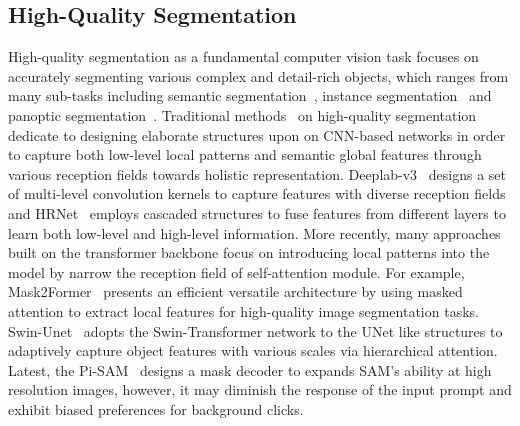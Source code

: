 \subsection{High-Quality Segmentation}
High-quality segmentation as a fundamental computer vision task focuses on accurately segmenting various complex and detail-rich objects, which ranges from many sub-tasks including semantic segmentation~\cite{long2015fully,zhao2017pyramid}, instance segmentation~\cite{he2017mask,dai2016instance} and panoptic segmentation~\cite{kirillov2019panoptic}. 
Traditional methods~\cite{Panoptic-deeplab,deeplab-v3,hrnet,medseg1,cascadepsp} on high-quality segmentation dedicate to designing elaborate structures upon on CNN-based networks in order to capture both low-level local patterns and semantic global features through various reception fields towards holistic representation.
Deeplab-v3~\cite{deeplab-v3} designs a set of multi-level convolution kernels to capture features with diverse reception fields and HRNet~\cite{hrnet} employs cascaded structures to fuse features from different layers to learn both low-level and high-level information.
More recently, many approaches~\cite{swin-unet,SegFormer,SegGPT,maskformer,mask2former} built on the transformer backbone focus on introducing local patterns into the model by narrow the reception field of self-attention module. For example, Mask2Former~\cite{mask2former} presents an efficient versatile architecture by using masked attention to extract local features for high-quality image segmentation tasks. Swin-Unet~\cite{swin-unet} adopts the Swin-Transformer network to the UNet like structures to adaptively capture object features with various scales via hierarchical attention.
Latest, the Pi-SAM~\cite{liu2024segment} designs a mask decoder to expands SAM’s ability at high resolution images, however, it may diminish the response of the input prompt and exhibit biased preferences for background clicks. 
